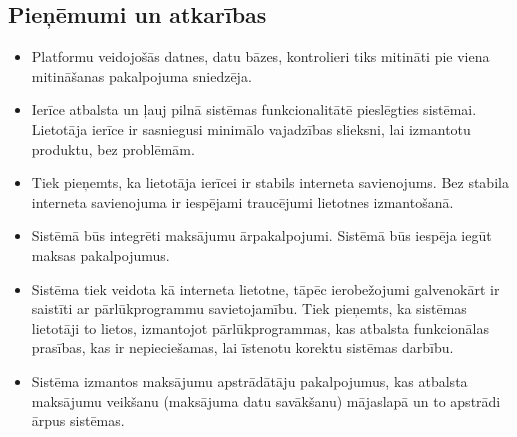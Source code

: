 \subsection{Pieņēmumi un atkarības}
\begin{itemize}
	\item Platformu veidojošās datnes, datu bāzes, kontrolieri tiks mitināti pie viena mitināšanas pakalpojuma sniedzēja.
	\item Ierīce atbalsta un ļauj pilnā sistēmas funkcionalitātē pieslēgties sistēmai.
	      Lietotāja ierīce ir sasniegusi minimālo vajadzības slieksni, lai izmantotu produktu, bez problēmām.
	\item Tiek pieņemts, ka lietotāja ierīcei ir stabils interneta savienojums.
	      Bez stabila interneta savienojuma ir iespējami traucējumi lietotnes izmantošanā.
	\item Sistēmā būs integrēti maksājumu ārpakalpojumi.
	      Sistēmā būs iespēja iegūt maksas pakalpojumus.
	\item Sistēma tiek veidota kā interneta lietotne, tāpēc ierobežojumi galvenokārt ir saistīti ar pārlūkprogrammu savietojamību.
	      Tiek pieņemts, ka sistēmas lietotāji to lietos, izmantojot pārlūkprogrammas, kas atbalsta funkcionālas prasības, kas ir nepieciešamas, lai īstenotu korektu sistēmas darbību.
	\item Sistēma izmantos maksājumu apstrādātāju pakalpojumus, kas atbalsta maksājumu veikšanu (maksājuma datu savākšanu) mājaslapā un to apstrādi ārpus sistēmas.
\end{itemize}
